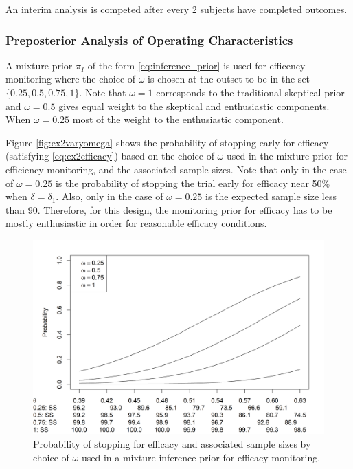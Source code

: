 \documentclass[12pt]{article}
\begin{document}
An interim analysis is competed after every 2 subjects have completed outcomes.

\subsubsection{Preposterior Analysis of Operating Characteristics}\label{sec:ex2operatingcharacteristics}
A mixture prior $\pi_I$ of the form \eqref{eq:inference_prior} is used for efficency monitoring where the choice of $\omega$ is chosen at the outset to be in the set $\{0.25,0.5,0.75,1\}$. Note that $\omega=1$ corresponds to the traditional skeptical prior and $\omega=0.5$ gives equal weight to the skeptical and enthusiastic components. When $\omega=0.25$ most of the weight to the enthusiastic component.

Figure \ref{fig:ex2varyomega} shows the probability of stopping early for efficacy (satisfying \eqref{eq:ex2efficacy}) based on the choice of $\omega$ used in the mixture prior for efficiency monitoring, and the associated sample sizes. Note that only in the case of $\omega=0.25$ is the probability of stopping the trial early for efficacy near 50\% when $\delta=\delta_1$. Also, only in the case of $\omega=0.25$ is the expected sample size less than 90. Therefore, for this design, the monitoring prior for efficacy has to be mostly enthusiastic in order for reasonable efficacy conditions.

\begin{figure}\begin{center}
    \centering\includegraphics[width=7in]{./FIGURES/figure6.png}
    \caption{Probability of stopping for efficacy and associated sample sizes by choice of $\omega$ used in a mixture inference prior for efficacy monitoring.}
\label{fig:varyomega}
 \end{center}\end{figure}
\end{document}
